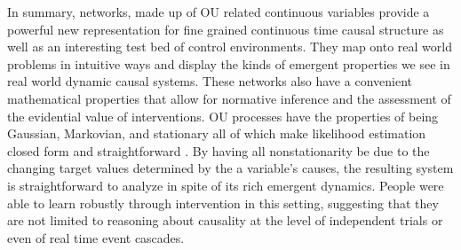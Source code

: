 \documentclass{cambridge7A}%
\begin{document}
In summary, networks, made up of OU related continuous variables provide a powerful new representation for fine grained continuous time causal structure as well as an interesting test bed of control environments.  They map onto real world problems in intuitive ways and display the kinds of emergent properties we see in real world dynamic causal systems.  These networks also have a convenient mathematical properties that allow for normative inference and the assessment of the evidential value of interventions.  OU processes have the properties of being Gaussian, Markovian, and stationary all of which make likelihood estimation closed form and straightforward \citep{uhlenbeck1930theory}.  By having all nonstationarity be due to the changing target values determined by the a variable's causes, the resulting system is straightforward to analyze in spite of its rich emergent dynamics.   People were able to learn robustly through intervention in this setting, suggesting that they are not limited to reasoning about causality at the level of independent trials or even of real time event cascades.
\end{document}
